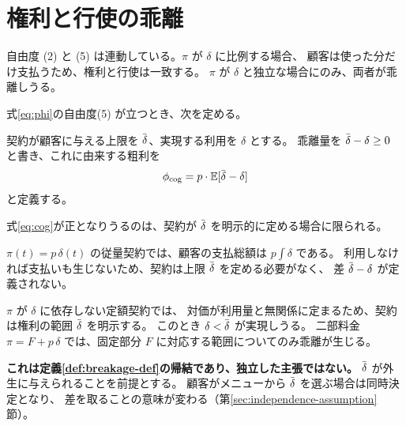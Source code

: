 \section{権利と行使の乖離}
\label{sec:breakage}

自由度 (2) と (5) は連動している。$\pi$ が $\delta$ に比例する場合、
顧客は使った分だけ支払うため、権利と行使は一致する。
$\pi$ が $\delta$ と独立な場合にのみ、両者が乖離しうる。

式\eqref{eq:phi}の自由度(5) が立つとき、次を定める。

\begin{definition}[権利と行使]
\label{def:breakage-def}
契約が顧客に与える上限を $\dbar$、実現する利用を $\delta$ とする。
乖離量を $\dbar-\delta \geq 0$ と書き、これに由来する粗利を
\begin{equation}
\phi_{\mathrm{cog}} = p\cdot\E[\dbar-\delta]
\label{eq:cog}
\end{equation}
と定義する。
\end{definition}

\begin{remark}[乖離が生じる契約形態]
\label{prop:breakage}
式\eqref{eq:cog}が正となりうるのは、契約が $\dbar$ を明示的に定める場合に限られる。

$\pi(t)=p\,\delta(t)$ の従量契約では、顧客の支払総額は $p\int\delta$ である。
利用しなければ支払いも生じないため、契約は上限 $\dbar$ を定める必要がなく、
差 $\dbar-\delta$ が定義されない。

$\pi$ が $\delta$ に依存しない定額契約では、
対価が利用量と無関係に定まるため、契約は権利の範囲 $\dbar$ を明示する。
このとき $\delta<\dbar$ が実現しうる。
二部料金 $\pi=F+p\,\delta$ では、固定部分 $F$ に対応する範囲についてのみ乖離が生じる。

\textbf{これは定義\ref{def:breakage-def}の帰結であり、独立した主張ではない。}
$\dbar$ が外生に与えられることを前提とする。
顧客がメニューから $\dbar$ を選ぶ場合は同時決定となり、
差を取ることの意味が変わる（第\ref{sec:independence-assumption}節）。
\end{remark}

